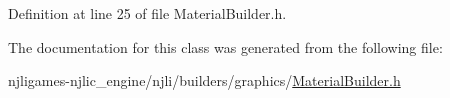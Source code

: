 Definition at line 25 of file Material\+Builder.\+h.



The documentation for this class was generated from the following file\+:\begin{DoxyCompactItemize}
\item 
njligames-\/njlic\+\_\+engine/njli/builders/graphics/\mbox{\hyperlink{_material_builder_8h}{Material\+Builder.\+h}}\end{DoxyCompactItemize}
